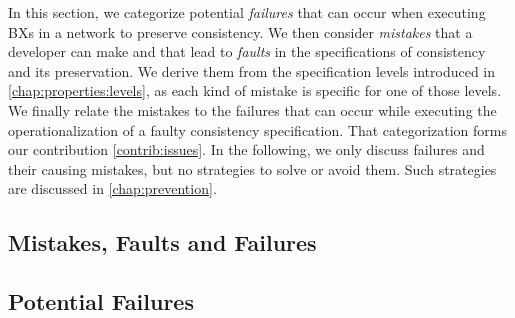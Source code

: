 In this section, we %
categorize potential \emph{failures} that can occur when executing \acp{BX} in a network to preserve consistency.
We then consider \emph{mistakes} that a developer can make and that lead to \emph{faults} in the specifications of consistency and its preservation.
We derive them from the specification levels introduced in \autoref{chap:properties:levels}, as each kind of mistake is specific for one of those levels.
We finally relate the mistakes to the failures that can occur while executing the operationalization of a faulty consistency specification.
That categorization forms our contribution \ref{contrib:issues}.
In the following, we only discuss failures and their causing mistakes, but no strategies to solve or avoid them.
Such strategies are discussed in \autoref{chap:prevention}.



\subsection{Mistakes, Faults and Failures}

\subsection{Potential Failures}
\label{chap:errors:failures}

